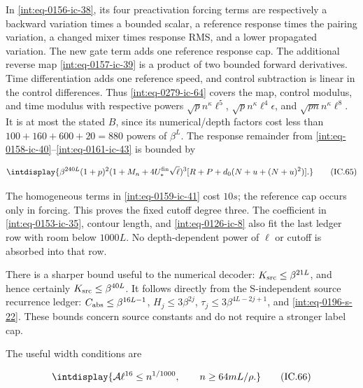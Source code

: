 In \eqref{int:eq-0156-ic-38}, its four preactivation forcing terms are respectively a backward variation times a bounded scalar, a reference response times the pairing variation, a changed mixer times response RMS, and a lower propagated variation. The new gate term adds one reference response cap. The additional reverse map \eqref{int:eq-0157-ic-39} is a product of two bounded forward derivatives. Time differentiation adds one reference speed, and control subtraction is linear in the control differences. Thus \eqref{int:eq-0279-ic-64} covers the map, control modulus, and time modulus with respective powers \(\sqrt p n^\kappa\ell^5\), \(\sqrt p n^\kappa\ell^4\epsilon\), and \(\sqrt{pn}n^\kappa\ell^8\). It is at most the stated \(B\), since its numerical/depth factors cost less than \(100+160+600+20=880\) powers of \(\beta^L\). The response remainder from \eqref{int:eq-0158-ic-40}--\allowbreak \eqref{int:eq-0161-ic-43} is bounded by


\begingroup\renewcommand{\theHequation}{intdisplay.659}
\begin{equation}
\intdisplay{
\beta^{240L}(1+p)^2(1+M_n+4U_*^{\rm fin}\sqrt\ell)^3
 [R+P+d_0(N+u+(N+u)^2)].
}
\tag{IC.65}
\label{int:eq-0280-ic-65}
\end{equation}
\endgroup


The homogeneous terms in \eqref{int:eq-0159-ic-41} cost \(10s\); the reference cap occurs only in forcing. This proves the fixed cutoff degree three. The coefficient in \eqref{int:eq-0153-ic-35}, contour length, and \eqref{int:eq-0126-ic-8} also fit the last ledger row with room below \(1000L\). No depth-dependent power of \(\ell\) or cutoff is absorbed into that row.



There is a sharper bound useful to the numerical decoder: \(K_{\rm src}\le\beta^{21L}\), and hence certainly \(K_{\rm src}\le\beta^{40L}\). It follows directly from the S-independent source recurrence ledger: \(C_{\rm abs}\le\beta^{16L-1}\), \(H_j\le3\beta^{2j}\), \(\tau_j\le3\beta^{4L-2j+1}\), and \eqref{int:eq-0196-s-22}. These bounds concern source constants and do not require a stronger label cap.



The useful width conditions are


\begingroup\renewcommand{\theHequation}{intdisplay.660}
\begin{equation}
\intdisplay{
\mathcal A\ell^{16}\le n^{1/1000},\qquad n\ge64mL/\rho.
}
\tag{IC.66}
\label{int:eq-0281-ic-66}
\end{equation}
\endgroup

